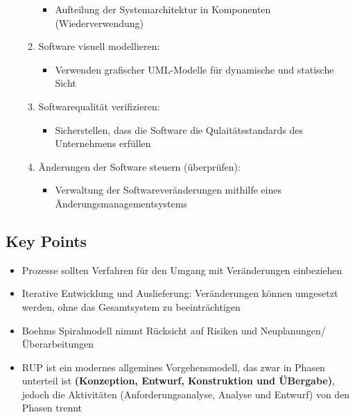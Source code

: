 \begin{itemize}
\begin{enumerate}
        \begin{itemize}
            \item Aufteilung der Systemarchitektur in Komponenten (Wiederverwendung)
        \end{itemize}
        \item Software visuell modellieren:
        \begin{itemize}
            \item Verwenden grafischer UML-Modelle für dynamische und statische Sicht 
        \end{itemize}
        \item Softwarequalität verifizieren:
        \begin{itemize}
            \item Sicherstellen, dass die Software die Qulaitätsstandards des Unternehmens erfüllen
        \end{itemize}
        \item Änderungen der Software steuern (überprüfen):
        \begin{itemize}
            \item Verwaltung der Softwareveränderungen mithilfe eines Änderungsmanagementsystems
        \end{itemize}
    \end{enumerate}
\end{itemize}

\subsection{Key Points}
\begin{itemize}
\item Prozesse sollten Verfahren für den Umgang mit Veränderungen einbeziehen
\item Iterative Entwicklung und Auslieferung: Veränderungen können umgesetzt werden, ohne das Gesamtsystem zu beeinträchtigen
    \item Boehms Spiralmodell nimmt Rücksicht auf Risiken und Neuplanungen/Überarbeitungen
    \item RUP ist ein modernes allgemines Vorgehensmodell, das zwar in Phasen unterteil ist \textbf{(Konzeption, Entwurf, Konstruktion und ÜBergabe)}, jedoch die Aktivitäten (Anforderungsanalyse, Analyse und Entwurf) von den Phasen trennt
\end{itemize}
